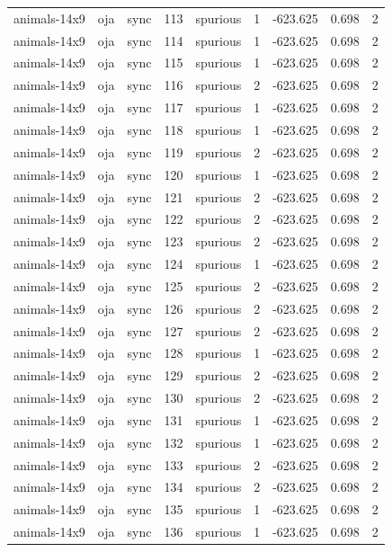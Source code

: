 \begin{tabular}{lllrlrrrr}
animals-14x9 & oja & sync & 113 & spurious & 1 & -623.625 & 0.698 & 2 \\
animals-14x9 & oja & sync & 114 & spurious & 1 & -623.625 & 0.698 & 2 \\
animals-14x9 & oja & sync & 115 & spurious & 1 & -623.625 & 0.698 & 2 \\
animals-14x9 & oja & sync & 116 & spurious & 2 & -623.625 & 0.698 & 2 \\
animals-14x9 & oja & sync & 117 & spurious & 1 & -623.625 & 0.698 & 2 \\
animals-14x9 & oja & sync & 118 & spurious & 1 & -623.625 & 0.698 & 2 \\
animals-14x9 & oja & sync & 119 & spurious & 2 & -623.625 & 0.698 & 2 \\
animals-14x9 & oja & sync & 120 & spurious & 1 & -623.625 & 0.698 & 2 \\
animals-14x9 & oja & sync & 121 & spurious & 2 & -623.625 & 0.698 & 2 \\
animals-14x9 & oja & sync & 122 & spurious & 2 & -623.625 & 0.698 & 2 \\
animals-14x9 & oja & sync & 123 & spurious & 2 & -623.625 & 0.698 & 2 \\
animals-14x9 & oja & sync & 124 & spurious & 1 & -623.625 & 0.698 & 2 \\
animals-14x9 & oja & sync & 125 & spurious & 2 & -623.625 & 0.698 & 2 \\
animals-14x9 & oja & sync & 126 & spurious & 2 & -623.625 & 0.698 & 2 \\
animals-14x9 & oja & sync & 127 & spurious & 2 & -623.625 & 0.698 & 2 \\
animals-14x9 & oja & sync & 128 & spurious & 1 & -623.625 & 0.698 & 2 \\
animals-14x9 & oja & sync & 129 & spurious & 2 & -623.625 & 0.698 & 2 \\
animals-14x9 & oja & sync & 130 & spurious & 2 & -623.625 & 0.698 & 2 \\
animals-14x9 & oja & sync & 131 & spurious & 1 & -623.625 & 0.698 & 2 \\
animals-14x9 & oja & sync & 132 & spurious & 1 & -623.625 & 0.698 & 2 \\
animals-14x9 & oja & sync & 133 & spurious & 2 & -623.625 & 0.698 & 2 \\
animals-14x9 & oja & sync & 134 & spurious & 2 & -623.625 & 0.698 & 2 \\
animals-14x9 & oja & sync & 135 & spurious & 1 & -623.625 & 0.698 & 2 \\
animals-14x9 & oja & sync & 136 & spurious & 1 & -623.625 & 0.698 & 2 \\

\end{tabular}
